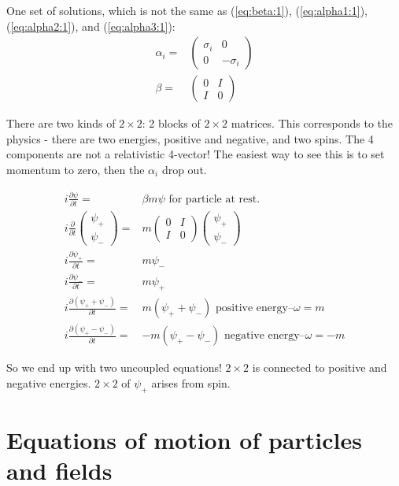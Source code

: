 \documentclass[]{article}
\begin{document}
One set of solutions, which is not the same as (\ref{eq:beta:1}), (\ref{eq:alpha1:1}), (\ref{eq:alpha2:1}), and (\ref{eq:alpha3:1}):
\begin{align*}
	\alpha_i=&\begin{pmatrix}
		\sigma_i&0\\
		0&-\sigma_i
	\end{pmatrix}\\
	\beta =& \begin{pmatrix}
		0&I\\
		I&0
	\end{pmatrix}
\end{align*}

There are two kinds of $2\times2$: 2 blocks of $2\times2$ matrices. This corresponds to the physics - there are two energies, positive and negative, and two spins.
The 4 components are not a relativistic 4-vector! The easiest way to see this is to set momentum to zero, then the $\alpha_i$ drop out.

\begin{align*}
i \frac{\partial \psi}{\partial t} =&  \beta m \psi \text{ for particle at rest.}\\
i \frac{\partial}{\partial t}\begin{pmatrix}
\psi_+\\
\psi_-
\end{pmatrix}=&m \begin{pmatrix}
0&I\\
I&0
\end{pmatrix}\begin{pmatrix}
\psi_+\\
\psi_-
\end{pmatrix}\\
i \frac{\partial \psi_+}{\partial t} =&   m \psi_-\\
i \frac{\partial \psi_-}{\partial t} =&   m \psi_+ \\
i \frac{\partial (\psi_++\psi_-)}{\partial t} =&   m (\psi_++\psi_-) \text{ positive energy--$\omega=m$}\\
i \frac{\partial (\psi_+-\psi_-)}{\partial t} =&   -m (\psi_+-\psi_-) \text{ negative energy--$\omega=-m$}
\end{align*}

So we end up with two uncoupled equations! $2\times2$ is connected to positive and negative energies. $2\times2$ of $\psi_+$ arises from spin.


\section{Equations of motion of particles and fields}\label{sect:equation:motion}
\end{document}
